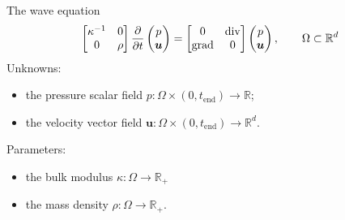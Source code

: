 \documentclass[aspectratio=169]{beamer}
\DeclareMathOperator*{\grad}{grad}
\renewcommand{\div}{\operatorname{div}}
\newcommand{\bbR}{\mathbb{R}}
\begin{document}
\begin{frame}{The wave equation}
	\begin{equation*}
		\begin{bmatrix}
			\kappa^{-1} & 0 \\
			0 & \rho
		\end{bmatrix}\diffp{}{t}\begin{pmatrix}
			p \\ \bm{u}
		\end{pmatrix} = 
		\begin{bmatrix}
			0 & \div \\
			\grad & 0 \\
		\end{bmatrix}\begin{pmatrix}
			p \\ \bm{u}
		\end{pmatrix},  \qquad \Omega \subset \bbR^d
	\end{equation*}
Unknowns:
\begin{itemize}
\item the pressure scalar field $p : \Omega \times (0, t_{\mathrm{end}}) \rightarrow \bbR$;
\item the velocity vector field $\bm{u} : \Omega \times (0, t_{\mathrm{end}}) \rightarrow \bbR^d$.
\end{itemize}
Parameters:
\begin{itemize}
\item the bulk modulus $\kappa: \Omega \rightarrow \bbR_+$ \\
\item the mass density $\rho: \Omega \rightarrow \bbR_+$.
\end{itemize}
\end{frame}
\end{document}
